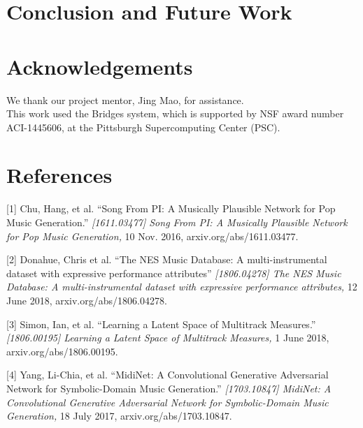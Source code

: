\documentclass{article}
\begin{document}


\section{Conclusion and Future Work}



\section{Acknowledgements}
We thank our project mentor, Jing Mao, for assistance.\\

This work used the Bridges system, which is supported by NSF award number ACI-1445606, at the Pittsburgh Supercomputing Center (PSC).

\section*{References}


\small

[1] Chu, Hang, et al. ``Song From PI: A Musically Plausible Network for Pop Music Generation.'' {\it [1611.03477] Song From PI: A Musically Plausible Network for Pop Music Generation,} 10 Nov. 2016, arxiv.org/abs/1611.03477.

[2] Donahue, Chris et al. ``The NES Music Database: A multi-instrumental dataset with expressive performance attributes'' {\it [1806.04278] The NES Music Database: A multi-instrumental dataset with expressive performance attributes,} 12 June 2018, arxiv.org/abs/1806.04278.

[3] Simon, Ian, et al. ``Learning a Latent Space of Multitrack Measures.'' {\it[1806.00195] Learning a Latent Space of Multitrack Measures,} 1 June 2018, arxiv.org/abs/1806.00195.

[4] Yang, Li-Chia, et al. ``MidiNet: A Convolutional Generative Adversarial Network for Symbolic-Domain Music Generation.'' {\it[1703.10847] MidiNet: A Convolutional Generative Adversarial Network for Symbolic-Domain Music Generation,} 18 July 2017, arxiv.org/abs/1703.10847.
\end{document}
